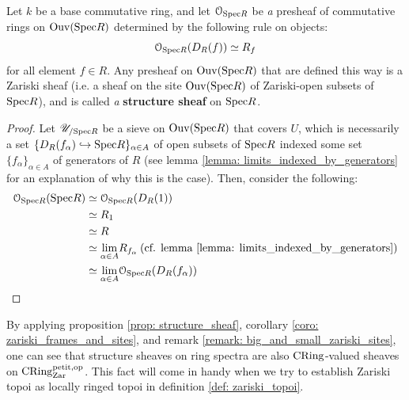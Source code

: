                 \begin{proposition} \label{prop: structure_sheaf} 
                    Let $k$ be a base commutative ring, and let $\mathcal{O}_{\mathrm{Spec} R}$ be \textit{a} presheaf of commutative rings on $\mathrm{Ouv}(\mathrm{Spec} R)$ determined by the following rule on objects:
                        $$\mathcal{O}_{\mathrm{Spec} R}(D_R(f)) \simeq R_f$$
                    for all element $f \in R$. Any presheaf on $\mathrm{Ouv}(\mathrm{Spec} R)$ that are defined this way is a Zariski sheaf (i.e. a sheaf on the site $\mathrm{Ouv}(\mathrm{Spec} R)$ of Zariski-open subsets of $\mathrm{Spec} R$), and is called \textit{a} \textbf{structure sheaf} on $\mathrm{Spec} R$.
                \end{proposition}
                    \begin{proof}
                        Let $\mathscr{U}_{/\mathrm{Spec} R}$ be a sieve on $\mathrm{Ouv}(\mathrm{Spec} R)$ that covers $U$, which is necessarily a set $\{D_R(f_{\alpha}) \hookrightarrow \mathrm{Spec} R\}_{\alpha \in A}$ of open subsets of $\mathrm{Spec} R$ indexed some set $\{f_{\alpha}\}_{\alpha \in A}$ of generators of $R$ (see lemma \ref{lemma: limits_indexed_by_generators} for an explanation of why this is the case). Then, consider the following:
                            $$
                                \begin{aligned}
                                    \mathcal{O}_{\mathrm{Spec} R}(\mathrm{Spec} R) & \simeq \mathcal{O}_{\mathrm{Spec} R}(D_R(1))
                                    \\
                                    & \simeq R_1
                                    \\
                                    & \simeq R
                                    \\
                                    & \simeq \underset{\alpha \in A}{\operatorname{lim}} R_{f_{\alpha}} \: \text{(cf. lemma \ref{lemma: limits_indexed_by_generators})}
                                    \\
                                    & \simeq \underset{\alpha \in A}{\operatorname{lim}} \mathcal{O}_{\mathrm{Spec} R}(D_R(f_{\alpha}))
                                \end{aligned}
                            $$
                    \end{proof}
                \begin{corollary}
                    By applying proposition \ref{prop: structure_sheaf}, corollary \ref{coro: zariski_frames_and_sites}, and remark \ref{remark: big_and_small_zariski_sites}, one can see that structure sheaves on ring spectra are also $\mathrm{CRing}$-valued sheaves on $\mathrm{CRing}^{\mathrm{petit}, \mathrm{op}}_{\mathrm{Zar}}$. This fact will come in handy when we try to establish Zariski topoi as locally ringed topoi in definition \ref{def: zariski_topoi}.
                \end{corollary}
